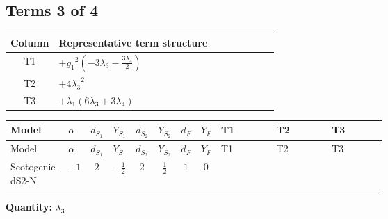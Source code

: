 \documentclass[8pt]{article}
\begin{document}
\begin{landscape}
\subsection*{Terms 3 of 4}
\begin{center}
\begin{tabular}{@{}c >{\raggedright\arraybackslash}p{0.82\linewidth}@{}}
\toprule
Column & Representative term structure \\
\midrule
T1 & \(\displaystyle +{g_1}^2 \left(-3 {\lambda_3}-\frac{3 {\lambda_4}}{2}\right)\) \\
\midrule
T2 & \(\displaystyle +4 {\lambda_3}^2\) \\
\midrule
T3 & \(\displaystyle +{\lambda_1} (6 {\lambda_3}+3 {\lambda_4})\) \\
\midrule
\bottomrule
\end{tabular}
\end{center}
\smallskip
\tiny
\begin{longtable}{@{}llcccccc >{\raggedright\arraybackslash}p{0.21\linewidth} >{\raggedright\arraybackslash}p{0.21\linewidth} >{\raggedright\arraybackslash}p{0.21\linewidth}@{}}
\toprule
Model & $\alpha$ & $d_{S_1}$ & $Y_{S_1}$ & $d_{S_2}$ & $Y_{S_2}$ & $d_F$ & $Y_F$ & T1 & T2 & T3 \\
\midrule
\endfirsthead
\toprule
Model & $\alpha$ & $d_{S_1}$ & $Y_{S_1}$ & $d_{S_2}$ & $Y_{S_2}$ & $d_F$ & $Y_F$ & T1 & T2 & T3 \\
\midrule
\endhead
Scotogenic-dS2-N & $-1$ & $2$ & $-\frac{1}{2}$ & $2$ & $\frac{1}{2}$ & $1$ & $0$ & \scriptsize\adjustbox{max width=\linewidth}{$\begin{gathered} +{g_1}^2 \left(-3 {\lambda_3}-\frac{3 {\lambda_4}}{2}\right)\end{gathered}$} & \scriptsize\adjustbox{max width=\linewidth}{$\begin{gathered} +4 {\lambda_3}^2\end{gathered}$} & \scriptsize\adjustbox{max width=\linewidth}{$\begin{gathered} +{\lambda_1} (6 {\lambda_3}+3 {\lambda_4})\end{gathered}$} \\
\midrule
\bottomrule
\end{longtable}
\clearpage
\noindent\textbf{Quantity: }$\lambda_3$\par\smallskip

\end{landscape}
\end{document}
